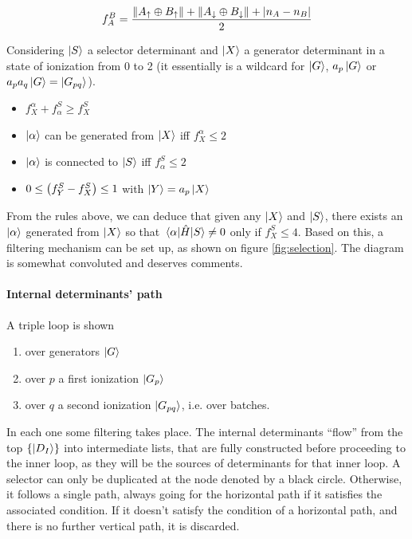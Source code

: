 \documentclass[./thesis.tex]{subfiles}
\begin{document}
\begin{equation}
f_A^B = \frac{\norm{A_\uparrow \oplus B_\uparrow} + \norm{A_\downarrow \oplus B_\downarrow} + |n_A-n_B|}{2}
\end{equation}


Considering $\ket S$ a selector determinant and $\ket X$ a generator determinant in a state of ionization from 0 to 2 (it essentially is a wildcard for $\ket G$, $a_{p} \ket G$ or $a_{p} a_{q} \ket G = \ket {G_{pq}}$).

\begin{itemize}
\item
$f_X^\alpha + f_\alpha^S \geq f_X^S$
\item
$\ket \alpha$ can be generated from $\ket X$ iff $f_X^\alpha \leq 2$
\item
$\ket \alpha$ is connected to $\ket S$ iff $f_\alpha^S \leq 2$
\item
$0 \leq \qty(f_Y^S - f_X^S) \leq 1$ with $\ket Y = a_p \ket X$
\end{itemize}


From the rules above, we can deduce that given any $\ket X$ and $\ket S$, there exists an ${\ket{\alpha}}$ generated from $\ket X$ so that $\mel{\alpha}{\hat{H}}{S} \neq 0$ only if $f_X^S \leq 4$.
Based on this, a filtering mechanism can be set up, as shown on figure \ref{fig:selection}. The diagram is somewhat convoluted and deserves comments.

\paragraph{Internal determinants' path}
 
A triple loop is shown

\begin{enumerate}
\item
over generators $\ket G$
\item
over $p$ a first ionization $\ket{G_p}$
\item
over $q$ a second ionization $\ket{G_{pq}}$, i.e. over batches.
\end{enumerate}

In each one some filtering takes place. The internal determinants ``flow'' from the top $\{ {\ket{D_I}} \}$ into intermediate lists, that are fully constructed before proceeding to the inner loop, as they will be the sources of determinants for that inner loop.
A selector can only be duplicated at the node denoted by a black circle. Otherwise, it follows a single path, always going for the horizontal path if it satisfies the associated condition.
If it doesn't satisfy the condition of a horizontal path, and there is no further vertical path, it is discarded.
\end{document}
